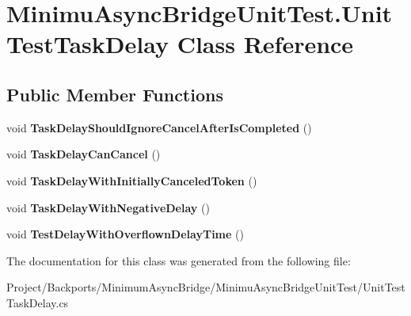 \hypertarget{class_minimu_async_bridge_unit_test_1_1_unit_test_task_delay}{}\section{Minimu\+Async\+Bridge\+Unit\+Test.\+Unit\+Test\+Task\+Delay Class Reference}
\label{class_minimu_async_bridge_unit_test_1_1_unit_test_task_delay}
\subsection*{Public Member Functions}
\begin{DoxyCompactItemize}
\item 
\mbox{\label{class_minimu_async_bridge_unit_test_1_1_unit_test_task_delay_afe95c9d5cb3b4422bd8eff3e81dccc0a}} 
void {\bfseries Task\+Delay\+Should\+Ignore\+Cancel\+After\+Is\+Completed} ()
\item 
\mbox{\label{class_minimu_async_bridge_unit_test_1_1_unit_test_task_delay_abd8cf84636708a8e3d2fdec6727747e4}} 
void {\bfseries Task\+Delay\+Can\+Cancel} ()
\item 
\mbox{\label{class_minimu_async_bridge_unit_test_1_1_unit_test_task_delay_ae42e803996e0abd30a2d149fba073796}} 
void {\bfseries Task\+Delay\+With\+Initially\+Canceled\+Token} ()
\item 
\mbox{\label{class_minimu_async_bridge_unit_test_1_1_unit_test_task_delay_a60ca04c75c9658fc652eb77b437e3755}} 
void {\bfseries Task\+Delay\+With\+Negative\+Delay} ()
\item 
\mbox{\label{class_minimu_async_bridge_unit_test_1_1_unit_test_task_delay_a9005a1a924aed71eefa9c136b80076d1}} 
void {\bfseries Test\+Delay\+With\+Overflown\+Delay\+Time} ()
\end{DoxyCompactItemize}


The documentation for this class was generated from the following file\+:\begin{DoxyCompactItemize}
\item 
Project/\+Backports/\+Minimum\+Async\+Bridge/\+Minimu\+Async\+Bridge\+Unit\+Test/Unit\+Test\+Task\+Delay.\+cs\end{DoxyCompactItemize}
